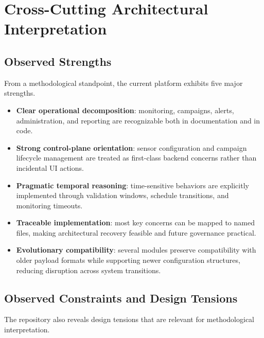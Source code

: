 \documentclass[11pt,a4paper]{article}
\begin{document}
\section{Cross-Cutting Architectural Interpretation}

\subsection{Observed Strengths}
From a methodological standpoint, the current platform exhibits five major strengths.

\begin{itemize}
  \item \textbf{Clear operational decomposition}: monitoring, campaigns, alerts, administration, and reporting are recognizable both in documentation and in code.
  \item \textbf{Strong control-plane orientation}: sensor configuration and campaign lifecycle management are treated as first-class backend concerns rather than incidental UI actions.
  \item \textbf{Pragmatic temporal reasoning}: time-sensitive behaviors are explicitly implemented through validation windows, schedule transitions, and monitoring timeouts.
  \item \textbf{Traceable implementation}: most key concerns can be mapped to named files, making architectural recovery feasible and future governance practical.
  \item \textbf{Evolutionary compatibility}: several modules preserve compatibility with older payload formats while supporting newer configuration structures, reducing disruption across system transitions.
\end{itemize}

\subsection{Observed Constraints and Design Tensions}
The repository also reveals design tensions that are relevant for methodological interpretation.
\end{document}
